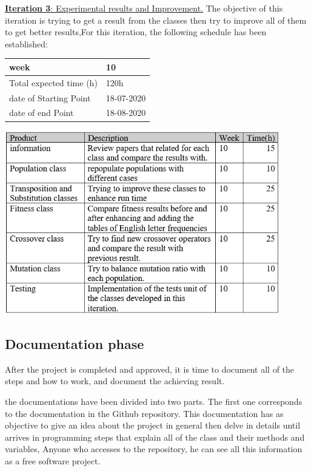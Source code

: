 \large{\underline{\textbf{Iteration 3}: Experimental results and Improvement.}}
\vspace{0.3cm}
The objective of this iteration is trying to get a result from the classes then try to improve all of them to get better results,For this iteration, the following schedule has been established:

\begin{table}[h!]
    \centering
    \begin{tabular}{|p{5cm}|p{4cm}|}
     \hline
        \cellcolor[gray]{0.9} week  & 10\\ \hline
        \cellcolor[gray]{0.9} Total expected time (h)  & 120h \\ \hline
        \cellcolor[gray]{0.9} date of Starting Point  & 18-07-2020 \\ \hline
        \cellcolor[gray]{0.9} date of end Point  & 18-08-2020 \\ \hline
            
\end{tabular}
\end{table}

\includegraphics[width=0.9\textwidth]{imagenes/it3.png}\\[1.4cm]

\subsection{Documentation phase}
After the project is completed and approved, it is time to document all of the steps and how to work, and document the achieving result.

the documentations have been divided into two parts. The first one corresponds to the documentation in the Github repository. This documentation has as objective to give an idea about the project in general then delve in details until arrives in programming steps that explain all of the class and their methods and variables,  Anyone who accesses to the repository, he can see all this information as a free software project.

